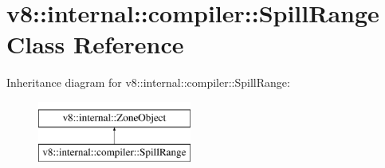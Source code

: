 \hypertarget{classv8_1_1internal_1_1compiler_1_1SpillRange}{}\section{v8\+:\+:internal\+:\+:compiler\+:\+:Spill\+Range Class Reference}
\label{classv8_1_1internal_1_1compiler_1_1SpillRange}
Inheritance diagram for v8\+:\+:internal\+:\+:compiler\+:\+:Spill\+Range\+:\begin{figure}[H]
\begin{center}
\leavevmode
\includegraphics[height=2.000000cm]{classv8_1_1internal_1_1compiler_1_1SpillRange}
\end{center}
\end{figure}
